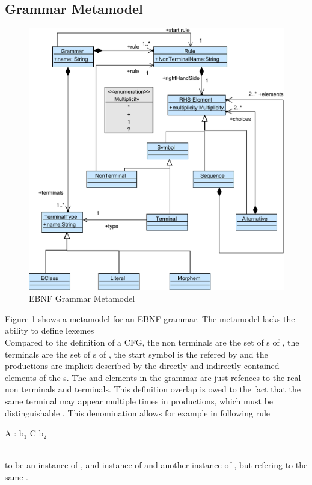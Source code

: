 \subsection{Grammar Metamodel}
\begin{figure}
\centering
\includegraphics[scale=0.85]{gfx/ex/Grammar_CFG} 
\caption{EBNF Grammar Metamodel}
\label{MM:EBNF}
\end{figure}

Figure \ref{MM:EBNF} shows a metamodel for an EBNF grammar. The metamodel lacks the ability to define lexemes  \\
Compared to the definition of a CFG, the non terminals are the set of s of , the terminals are the set of s of , the start symbol is the  refered by  and the productions are implicit described by the directly and indirectly contained elements of the s. The  and  elements in the grammar are just refences to the real non terminals and terminals. This definition overlap is owed to the fact that the same terminal may appear multiple times in productions, which must be distinguishable . This denomination allows for example in following rule
\\\begin{code}
A : b$_1$ C b$_2$
\end{code}\\
to be  an instance of ,  and instance of  and  another instance of , but refering to the same .

